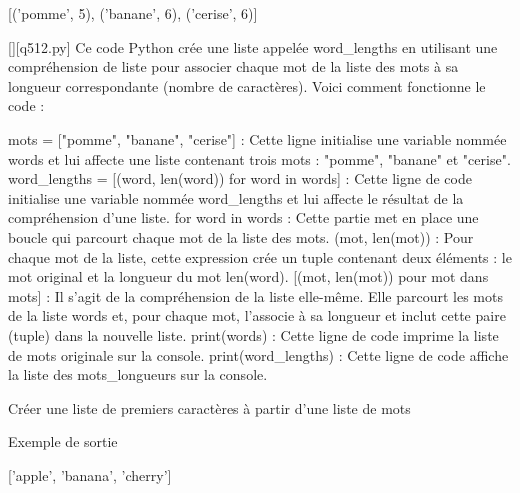 [('pomme', 5), ('banane', 6), ('cerise', 6)]
        \par
        \begin{solution}
            \renewcommand{\nomfichier}{q512.py}
            \pythonfile{\chemincode \nomfichier}[][\nomfichier]
            Ce code Python crée une liste appelée word_lengths en utilisant une compréhension de liste pour associer chaque mot de la liste des mots à sa longueur correspondante (nombre de caractères). Voici comment fonctionne le code :

    mots = ["pomme", "banane", "cerise"] : Cette ligne initialise une variable nommée words et lui affecte une liste contenant trois mots : "pomme", "banane" et "cerise".
    word_lengths = [(word, len(word)) for word in words] : Cette ligne de code initialise une variable nommée word_lengths et lui affecte le résultat de la compréhension d'une liste.
        for word in words : Cette partie met en place une boucle qui parcourt chaque mot de la liste des mots.
        (mot, len(mot)) : Pour chaque mot de la liste, cette expression crée un tuple contenant deux éléments : le mot original et la longueur du mot len(word).
        [(mot, len(mot)) pour mot dans mots] : Il s'agit de la compréhension de la liste elle-même. Elle parcourt les mots de la liste words et, pour chaque mot, l'associe à sa longueur et inclut cette paire (tuple) dans la nouvelle liste.
    print(words) : Cette ligne de code imprime la liste de mots originale sur la console.
    print(word_lengths) : Cette ligne de code affiche la liste des mots_longueurs sur la console.
        \end{solution}
        

        \question
        Créer une liste de premiers caractères à partir d'une liste de mots

Exemple de sortie

['apple', 'banana', 'cherry']

